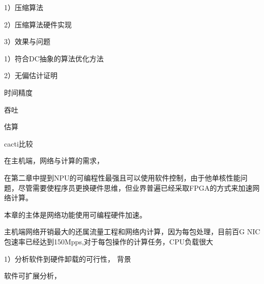 1）压缩算法

2）压缩算法硬件实现

3）效果与问题




1）符合DC抽象的算法优化方法

2）无偏估计证明








时间精度

吞吐

估算

cacti比较











在主机端，网络与计算的需求，

在第二章中提到NPU的可编程性最强且可以使用软件控制，由于他单核性能问题，尽管需要使程序员更换硬件思维，但业界普遍已经采取FPGA的方式来加速网络计算。

本章的主体是网络功能使用可编程硬件加速。

主机端网络开销最大的还属流量工程和网络内计算，因为每包处理，目前百G NIC 包速率已经达到150Mpps,对于每包操作的计算任务，CPU负载很大

1）分析软件到硬件卸载的可行性， 背景
	
	软件可扩展分析，



	




















